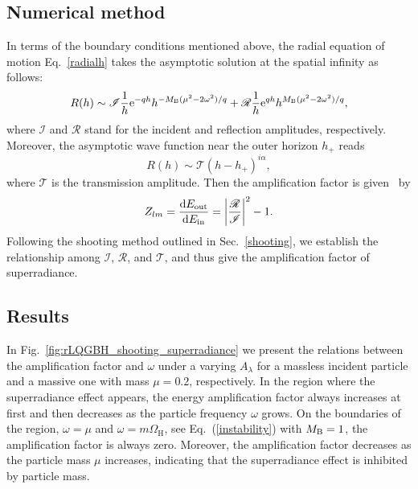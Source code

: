 \documentclass[12pt]{article}
\newcommand{\Hor}{\mathrm{H}}
\begin{document}
   \subsection{Numerical method} 
In terms of the boundary conditions  mentioned above, the radial equation of motion  Eq.~\eqref{radialh} takes the asymptotic solution at the spatial infinity as follows:
\begin{equation}
   	R(h)\sim \mathscr{I} \frac{1}{h}\mathrm e^{- qh}h^{ -M_{\rm B}(\mu^2-2\omega^2)/q}+ \mathscr{R}\frac{1}{h} \mathrm e^{ qh}h^{ M_{\rm B}(\mu^2-2\omega^2)/q},\label{super_infinity}
   \end{equation}
where $\mathscr{I}$ and $\mathscr{R}$ stand for the incident and  reflection amplitudes, respectively. Moreover,
the asymptotic wave function near the outer horizon $h_+$ reads 
   \begin{equation}
   	R(h)\sim \mathscr{T}(h-h_+)^{i\alpha},
   \end{equation}
where $\mathscr{T}$ is the transmission amplitude. 
Then the amplification factor is given~\cite{Brito:2015oca} by 
\begin{equation}\label{eq:Z}
   	Z_{lm}=\frac{\mathrm dE_{\rm out}}{\mathrm dE_{\rm in}}=\left| \frac{\mathscr R}{\mathscr I}\right| ^2-1.
\end{equation} 
Following the shooting method outlined in Sec.~\ref{shooting}, we establish the relationship among $\mathscr{I}$, $\mathscr{R}$, and $\mathscr{T}$, and thus give the amplification factor of superradiance. 
\subsection{Results}

In Fig.~\ref{fig:rLQGBH_shooting_superradiance} we present the relations between the amplification factor and $\omega$ under a varying $A_\lambda$ for a massless incident particle and a massive one with mass $\mu=0.2$, respectively.
In the region where the superradiance effect appears, the energy amplification factor always increases at first and then decreases as the particle frequency $\omega$ grows.
On the boundaries of the region, $\omega=\mu$ and $\omega=m\Omega_\Hor$, see Eq.~(\ref{instability}) with $M_{\rm B}=1$, the amplification factor is always zero.
Moreover, the amplification factor decreases as the particle mass $\mu$ increases, indicating that the superradiance effect is inhibited by particle mass.
\end{document}
